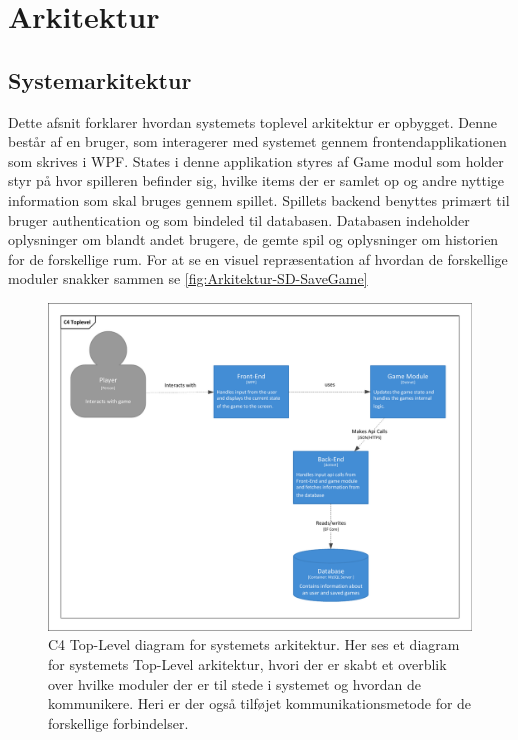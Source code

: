 \section{Arkitektur}

\subsection{Systemarkitektur}
\noindent
Dette afsnit forklarer hvordan systemets toplevel arkitektur er opbygget.
Denne består af en bruger, som interagerer med systemet gennem frontendapplikationen som skrives i WPF. 
States i denne applikation styres af Game modul som holder styr på hvor spilleren befinder sig, hvilke items der er samlet op og andre nyttige information som skal bruges gennem spillet.
Spillets backend benyttes primært til bruger authentication og som bindeled til databasen.
Databasen indeholder oplysninger om blandt andet brugere, de gemte spil og oplysninger om historien for de forskellige rum.
For at se en visuel repræsentation af hvordan de forskellige moduler snakker sammen se \autoref{fig:Arkitektur-SD-SaveGame}

\begin{figure}[H]
\centering
\includegraphics[width = \textwidth]{02-Body/Images/Arkitektur-C4TopLevel.pdf}
\caption{C4 Top-Level diagram for systemets arkitektur. Her ses et diagram for systemets Top-Level arkitektur, hvori der er skabt et overblik over hvilke moduler der er til stede i systemet og hvordan de kommunikere. Heri er der også tilføjet kommunikationsmetode for de forskellige forbindelser.}
\label{fig:Arkitektur-SD-SaveGame}
\end{figure}







